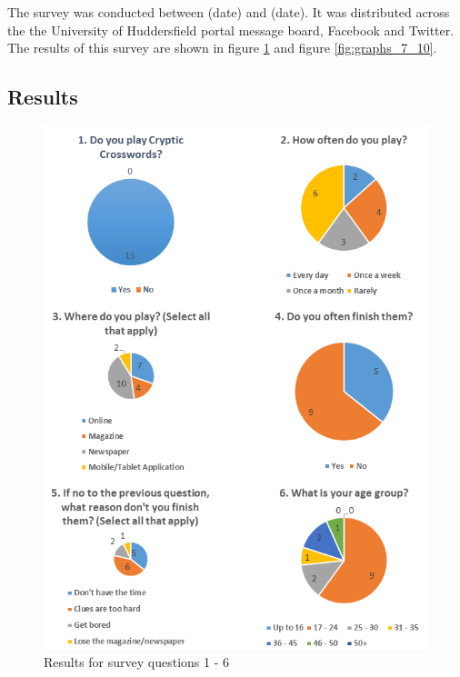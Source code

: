 The survey was conducted between (date) and (date). It was distributed across
the the University of Huddersfield portal message board, Facebook and Twitter. 
The results of this survey are shown in figure \ref{fig:graphs_1_6} and figure 
\ref{fig:graphs_7_10}.


\subsection{Results}

\begin{figure}[H]
  \centering
  \includegraphics[scale=0.8]{graphs_1_6.png}
  \caption{Results for survey questions 1 - 6}
  \label{fig:graphs_1_6}
\end{figure}

